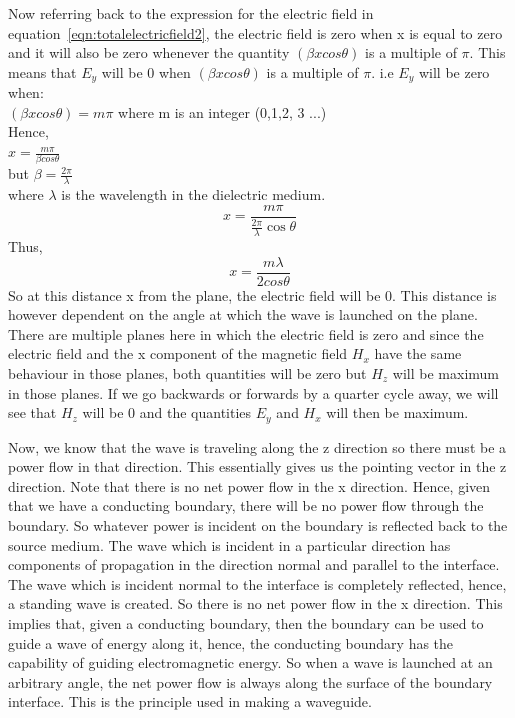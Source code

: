 Now referring back to the expression for the electric field in equation~\ref{eqn:totalelectricfield2}, the electric field is zero when x is equal to zero and it will also be zero whenever the quantity $(\beta xcos\theta)$ is a multiple of $\pi$. This means that $E_y$ will be 0 when $(\beta xcos\theta)$ is a multiple of $\pi$. i.e $E_y$ will be zero when:\\
$(\beta xcos\theta) = m\pi$     where m is an integer (0,1,2, 3 ...)\\ 
Hence,\\
$ x = \frac{m\pi}{\beta cos\theta}$   \\ 
but $\beta = \frac{2\pi}{\lambda}$ \\
where $\lambda$ is the wavelength in the dielectric medium.
\begin{equation*}
	x =\frac{m\pi}{\frac{2\pi}{\lambda}\cos\theta}
\end{equation*} 
Thus,
\begin{equation}
	x = \frac{m\lambda}{2cos\theta}
\end{equation}
So at this distance x from the plane, the electric field will be 0. This distance is however dependent on the angle at which the wave is launched on the plane. There are multiple planes here in which the electric field is zero and since the electric field and the x component of the magnetic field $H_x$ have the same behaviour in those planes, both quantities will be zero but $H_z$ will be maximum in those planes. If we go backwards or forwards by a quarter cycle away, we will see that $H_z$ will be 0 and the quantities $E_y$ and $H_x$ will then be maximum.

Now, we know that the wave is traveling along the z direction so there must be a power flow in that direction. This essentially gives us the pointing vector in the z direction. Note that there is no net power flow in the x direction. Hence, given that we have a conducting boundary, there will be no power flow through the boundary. So whatever power is incident on the boundary is reflected back to the source medium. The wave which is incident in a particular direction has components of propagation in the direction normal and parallel to the interface. The wave which is incident normal to the interface is completely reflected, hence, a standing wave is created. So there is no net power flow in the x direction. This implies that, given a conducting boundary, then the boundary can be used to guide a wave of energy along it, hence, the conducting boundary has the capability of guiding electromagnetic energy. So when a wave is launched at an arbitrary angle, the net power flow is always along the surface of the boundary interface. This is the principle used in making a waveguide. 

